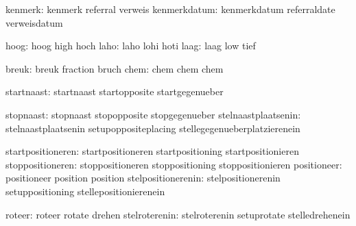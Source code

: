                       kenmerk:  kenmerk                      referral
                                verweis
                 kenmerkdatum:  kenmerkdatum                 referraldate
                                verweisdatum

                         hoog:  hoog                         high
                                hoch
                         laho:  laho                         lohi
                                hoti
                         laag:  laag                         low
                                tief


                        breuk:  breuk                        fraction
                                bruch
                         chem:  chem                         chem
                                chem

                   startnaast:  startnaast                   startopposite
                                startgegenueber

                    stopnaast:  stopnaast                    stopopposite
                                stopgegenueber
          stelnaastplaatsenin:  stelnaastplaatsenin          setupoppositeplacing
                                stellegegenueberplatzierenein

            startpositioneren:  startpositioneren            startpositioning
                                startpositionieren
             stoppositioneren:  stoppositioneren             stoppositioning
                                stoppositionieren
                  positioneer:  positioneer                  position
                                position
           stelpositionerenin:  stelpositionerenin           setuppositioning
                                stellepositionierenein

                       roteer:  roteer                       rotate
                                drehen
                stelroterenin:  stelroterenin                setuprotate
                                stelledrehenein

